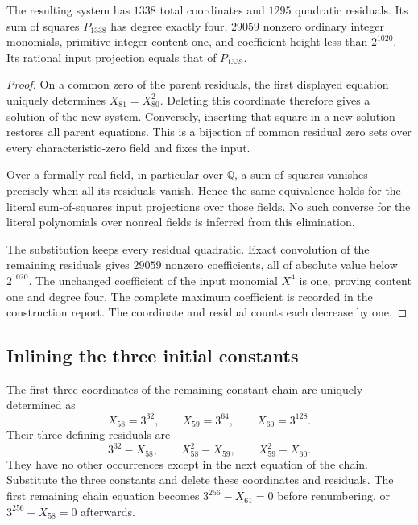 \begin{proposition}\label{prop:p3-small-coefficient-1338}
The resulting system has $1338$ total coordinates and $1295$
quadratic residuals.  Its sum of squares $P_{1338}$ has degree exactly
four, $29059$ nonzero ordinary integer monomials, primitive integer
content one, and coefficient height less than $2^{1020}$.
Its rational input projection equals that of $P_{1339}$.
\end{proposition}
\begin{proof}
On a common zero of the parent residuals, the first displayed equation
uniquely determines $X_{81}=X_{80}^2$.  Deleting this coordinate
therefore gives a solution of the new system.  Conversely, inserting
that square in a new solution restores all parent equations.  This
is a bijection of common residual zero sets over every
characteristic-zero field and fixes the input.

Over a formally real field, in particular over $\mathbb Q$, a sum
of squares vanishes precisely when all its residuals vanish.  Hence
the same equivalence holds for the literal sum-of-squares input
projections over those fields.  No such converse for the literal
polynomials over nonreal fields is inferred from this elimination.

The substitution keeps every residual quadratic.  Exact convolution
of the remaining residuals gives $29059$ nonzero coefficients, all
of absolute value below $2^{1020}$.  The unchanged coefficient of
the input monomial $X^4$ is one, proving content one and degree four.
The complete maximum coefficient is recorded in the construction
report.  The coordinate and residual counts each decrease by one.
\end{proof}

\subsection{Inlining the three initial constants}

The first three coordinates of the remaining constant chain are
uniquely determined as
\[
                  X_{58}=3^{32},\qquad X_{59}=3^{64},
                  \qquad X_{60}=3^{128}.
\]
Their three defining residuals are
\[
       3^{32}-X_{58},\qquad X_{58}^2-X_{59},
       \qquad X_{59}^2-X_{60}.
\]
They have no other occurrences except in the next equation of
the chain.  Substitute the three constants and delete these
coordinates and residuals.  The first remaining chain equation
becomes $3^{256}-X_{61}=0$ before renumbering, or
$3^{256}-X_{58}=0$ afterwards.

